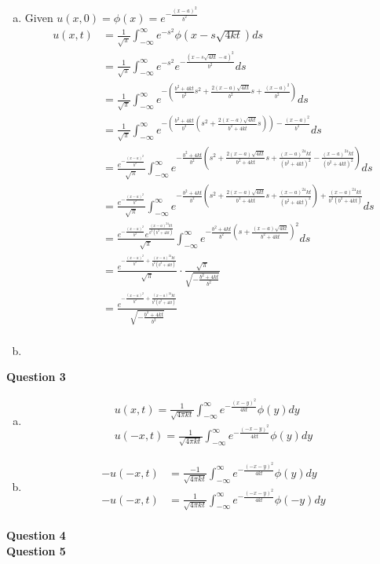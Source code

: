 \documentclass[12pt, letterpaper]{article}
\begin{document}
\begin{enumerate}[(a)]
    \item Given $u(x,0) = \phi(x) = e^{-\frac{(x-a)^2}{b^2}}$
    \begin{align*}
        u(x,t) &= \frac{1}{\sqrt \pi} \int_{-\infty}^{\infty} e^{-s^2}\phi(x-s\sqrt{4kt})ds \\
        &= \frac{1}{\sqrt \pi} \int_{-\infty}^{\infty}e^{-s^2}e^{-\frac{(x-s\sqrt{4kt}-a)^2}{b^2}} ds \\
        &= \frac{1}{\sqrt \pi} \int_{-\infty}^{\infty}e^{-\left(\frac{b^2+4kt}{b^2}s^2+\frac{2(x-a)\sqrt{4kt}}{b^2}s+\frac{(x-a)^2}{b^2}\right)} ds \\
        &= \frac{1}{\sqrt \pi} \int_{-\infty}^{\infty}e^{-\left(\frac{b^2+4kt}{b^2}\left(s^2+\frac{2(x-a)\sqrt{4kt}}{b^2+4kt}s\right)\right)-\frac{(x-a)^2}{b^2}} ds \\
        &= \frac{e^{-\frac{(x-a)^2}{b^2}}}{\sqrt\pi}\int_{-\infty}^{\infty}e^{-\frac{b^2+4kt}{b^2}\left(s^2+\frac{2(x-a)\sqrt{4kt}}{b^2+4kt}s+\frac{(x-a)^24kt}{(b^2+4kt)^2}-\frac{(x-a)^24kt}{(b^2+4kt)^2}\right)} ds \\
        &= \frac{e^{-\frac{(x-a)^2}{b^2}}}{\sqrt\pi}\int_{-\infty}^{\infty}e^{-\frac{b^2+4kt}{b^2}\left(s^2+\frac{2(x-a)\sqrt{4kt}}{b^2+4kt}s+\frac{(x-a)^24kt}{(b^2+4kt)^2}\right)+\frac{(x-a)^24kt}{b^2(b^2+4kt)}} ds \\
        &= \frac{e^{-\frac{(x-a)^2}{b^2}}e^{\frac{(x-a)^24kt}{b^2(b^2+4kt)}}}{\sqrt\pi}\int_{-\infty}^{\infty}e^{-\frac{b^2+4kt}{b^2}\left(s+\frac{(x-a)\sqrt{4kt}}{b^2+4kt}\right)^2}ds \\
        &= \frac{e^{-\frac{(x-a)^2}{b^2}+\frac{(x-a)^24kt}{b^2(b^2+4kt)}}}{\sqrt\pi} \cdot \frac{\sqrt{\pi}}{\sqrt{-\frac{b^2+4kt}{b^2}}} \\
        &= \frac{e^{-\frac{(x-a)^2}{b^2}+\frac{(x-a)^24kt}{b^2(b^2+4kt)}}}{\sqrt{-\frac{b^2+4kt}{b^2}}} \\
    \end{align*}
    \item 
\end{enumerate}
\newpage
\noindent \textbf{Question 3}
\begin{enumerate}[(a)]
    \item 
    \begin{align*}
        u(x,t) =\frac{1}{\sqrt{4\pi kt}}\int_{-\infty}^{\infty} e^{-\frac{(x-y)^2}{4kt}}\phi(y)dy \\
        u(-x,t)=\frac{1}{\sqrt{4\pi kt}}\int_{-\infty}^{\infty} e^{-\frac{(-x-y)^2}{4kt}}\phi(y)dy 
    \end{align*}
    \item 
    \begin{align*}
        -u(-x,t)&=\frac{-1}{\sqrt{4\pi kt}}\int_{-\infty}^{\infty} e^{-\frac{(-x-y)^2}{4kt}}\phi(y)dy \\
        -u(-x,t)&=\frac{1}{\sqrt{4\pi kt}}\int_{-\infty}^{\infty} e^{-\frac{(-x-y)^2}{4kt}}\phi(-y)dy \\
    \end{align*}
\end{enumerate}
\noindent \textbf{Question 4} \\
\noindent \textbf{Question 5} \\
\end{document}
